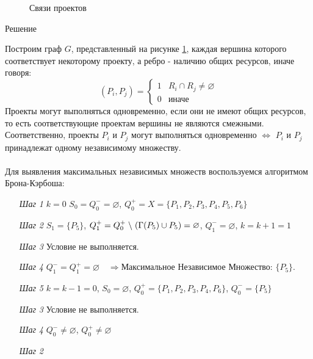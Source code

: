 \documentclass{article}
\begin{document}
\begin{enumerate}
\begin{figure}[ht]
\begin{minipage}[b]{.35\textwidth}
    \caption{Связи проектов}
    \label{fig:9_graph}
  \end{minipage}
\end{figure}
\begin{center}
Решение 
\end{center}
Построим граф $G$, представленный на рисунке \ref{fig:9_graph}, каждая вершина которого соответствует некоторому проекту, а ребро - наличию общих ресурсов, иначе говоря:
\begin{equation*}
(P_i,P_j) = 
 \begin{cases}
   1 &\text{$R_i \cap R_j \neq \varnothing$}\\
   0 &\text{иначе}
 \end{cases}
\end{equation*}
Проекты могут выполняться одновременно, если они не имеют общих ресурсов, то есть соответствующие проектам вершины не являются смежными. Соответственно, проекты $P_i$ и $P_j$ могут выполняться одновременно $\iff$ $P_i$ и $P_j$ принадлежат одному независимому множеству.\\
\\
Для выявления максимальных независимых множеств воспользуемся алгоритмом Брона-Кэрбоша:\\
\begin{enumerate}
    \item[\textit{Шаг 1}]$k = 0$
        \quad $S_0 = Q_0^{-} =\varnothing$,
        \quad  $Q_0^{+} = X = \{P_1,P_2,P_3,P_4,P_5,P_6\}$
    \item[\textit{Шаг 2}]
        $S_1 = \{P_5\}$,
        \quad  $Q_1^{+} =Q_0^{+} \hspace{1mm}\backslash\hspace{1mm} (\Gamma (P_5) \cup P_5) = \varnothing$,
        \quad  $Q_1^{-} = \varnothing$,
        \quad  $k = k + 1 = 1$
    \item[\textit{Шаг 3}] Условие не выполняется.
    \item[\textit{Шаг 4}] $Q_1^{-} = Q_1^{+} = \varnothing\quad\Longrightarrow \textbf{Максимальное Независимое Множество: }\{P_5\}$.
    \item[\textit{Шаг 5}] $k = k - 1 = 0$,
        \quad $S_0 =\varnothing$,
        \quad  $Q_0^{+} = \{P_1,P_2,P_3,P_4,P_6\}$,
        \quad  $Q_0^{-} = \{P_5\}$
    \item[\textit{Шаг 3}] Условие не выполняется.
    \item[\textit{Шаг 4}] $Q_0^{-} \neq \varnothing$,
        \quad $Q_0^{+}  \neq \varnothing$
    \item[\textit{Шаг 2}]

\end{enumerate}
\end{enumerate}
\end{document}
